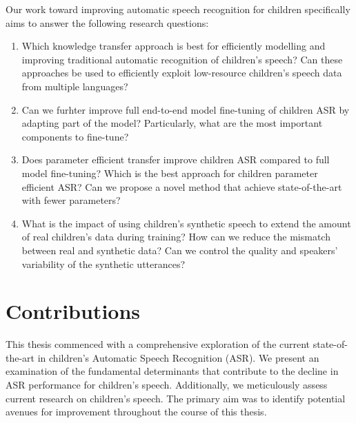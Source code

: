 Our work toward improving automatic speech recognition for children specifically aims to answer the following research questions:
\begin{enumerate} 
\item Which knowledge transfer approach is best for efficiently modelling and improving traditional automatic recognition of children's speech? Can these approaches be used to efficiently exploit low-resource children's speech data from multiple languages?
\item  Can we furhter improve full end-to-end model fine-tuning of children \ac{ASR} by adapting part of the model? Particularly, what are the most important components to fine-tune?

\item Does parameter efficient transfer improve children \ac{ASR} compared to full model fine-tuning? Which is the best approach for children parameter efficient \ac{ASR}? Can we propose a novel method that achieve state-of-the-art with fewer parameters? 

\item What is the impact of using children's synthetic speech to extend the amount of real children's data during training? How can we reduce the mismatch between real and synthetic data? Can we control the quality and speakers’ variability of the synthetic utterances?
\end{enumerate}

\section{Contributions}
This thesis commenced with a comprehensive exploration of the current state-of-the-art in children's Automatic Speech Recognition (\ac{ASR}). We present an examination of the fundamental determinants that contribute to the decline in \ac{ASR} performance for children's speech. Additionally, we meticulously assess current research on children's speech. The primary aim was to identify potential avenues for improvement throughout the course of this thesis. 

